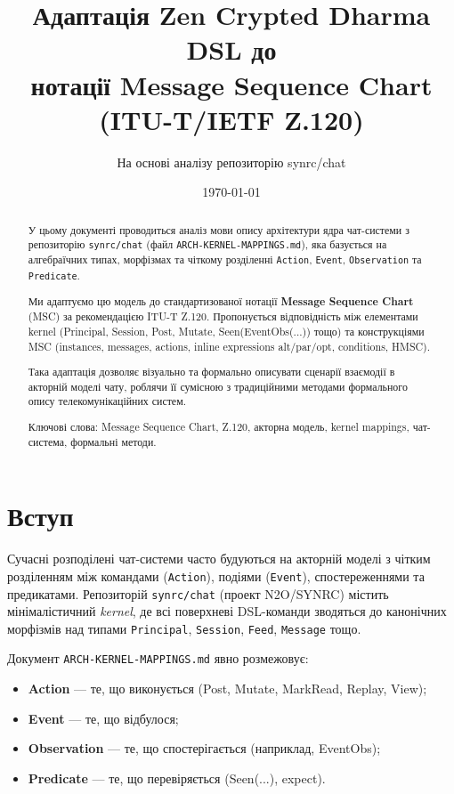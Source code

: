 \documentclass[11pt,a4paper]{article}
\title{Адаптація Zen Crypted Dharma DSL до \\ нотації Message Sequence Chart (ITU-T/IETF Z.120)}
\author{На основі аналізу репозиторію synrc/chat}
\date{\today}
\begin{document}
\maketitle

\begin{abstract}
У цьому документі проводиться аналіз мови опису архітектури ядра чат-системи з репозиторію \texttt{synrc/chat} (файл \texttt{ARCH-KERNEL-MAPPINGS.md}), яка базується на алгебраїчних типах, морфізмах та чіткому розділенні \texttt{Action}, \texttt{Event}, \texttt{Observation} та \texttt{Predicate}. 

Ми адаптуємо цю модель до стандартизованої нотації \textbf{Message Sequence Chart} (MSC) за рекомендацією ITU-T Z.120. Пропонується відповідність між елементами kernel (Principal, Session, Post, Mutate, Seen(EventObs(...)) тощо) та конструкціями MSC (instances, messages, actions, inline expressions alt/par/opt, conditions, HMSC). 

Така адаптація дозволяє візуально та формально описувати сценарії взаємодії в акторній моделі чату, роблячи її сумісною з традиційними методами формального опису телекомунікаційних систем. 

Ключові слова: Message Sequence Chart, Z.120, акторна модель, kernel mappings, чат-система, формальні методи.
\end{abstract}

\section{Вступ}

Сучасні розподілені чат-системи часто будуються на акторній моделі з чітким розділенням між командами (\texttt{Action}), подіями (\texttt{Event}), спостереженнями та предикатами. Репозиторій \texttt{synrc/chat} (проект N2O/SYNRC) містить мінімалістичний \textit{kernel}, де всі поверхневі DSL-команди зводяться до канонічних морфізмів над типами \texttt{Principal}, \texttt{Session}, \texttt{Feed}, \texttt{Message} тощо.

Документ \texttt{ARCH-KERNEL-MAPPINGS.md} явно розмежовує:
\begin{itemize}
    \item \textbf{Action} — те, що виконується (Post, Mutate, MarkRead, Replay, View);
    \item \textbf{Event} — те, що відбулося;
    \item \textbf{Observation} — те, що спостерігається (наприклад, EventObs);
    \item \textbf{Predicate} — те, що перевіряється (Seen(...), expect).
\end{itemize}
\end{document}
